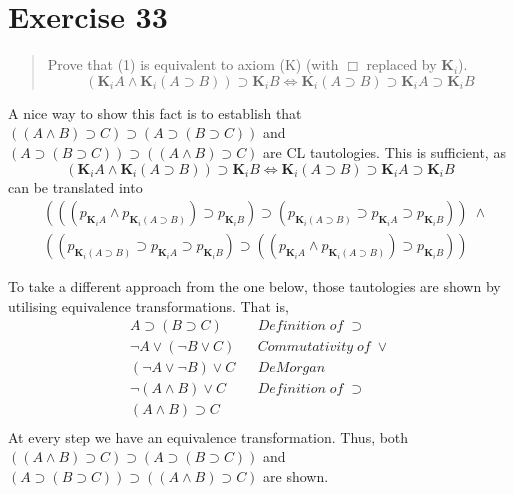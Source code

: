\documentclass[11pt,a4paper]{article}
\newcommand{\lto}{\supset}
\newcommand{\all}{\Box}
\newcommand{\eall}{\mathbf{K}}
\begin{document}
\section*{Exercise 33}
\begin{quote}
Prove that (1) is equivalent to axiom (K) (with $\all$ replaced by $\eall_i$).
\begin{equation*}
(\eall_i A \land \eall_i (A \lto B)) \lto \eall_i B \iff \eall_i(A \lto B) \lto \eall_i A \lto \eall_i B
\end{equation*}
\end{quote}

A nice way to show this fact is to establish that $((A \land B) \lto C) \lto (A \lto (B \lto C))$ and $(A \lto (B \lto C)) \lto ((A \land B) \lto C) $ are CL tautologies. This is sufficient, as 
\begin{equation*}
(\eall_i A \land \eall_i (A \lto B)) \lto \eall_i B \iff \eall_i(A \lto B) \lto \eall_i A \lto \eall_i B
\end{equation*}
can be translated into
\begin{equation*}
\begin{split}
&(((p_{\eall_i A} \land p_{\eall_i (A \lto B)}) \lto p_{\eall_i B}) \lto (p_{\eall_i(A \lto B)} \lto p_{\eall_i A} \lto p_{\eall_i B})) \; \land \\
&((p_{\eall_i(A \lto B)} \lto p_{\eall_i A} \lto p_{\eall_i B}) \lto ((p_{\eall_i A} \land p_{\eall_i (A \lto B)}) \lto p_{\eall_i B}))
\end{split}
\end{equation*}

To take a different approach from the one below, those tautologies are shown by utilising equivalence transformations. That is, 
\begin{align*}
& A \lto (B \lto C) &&  \mathit{Definition \; of \;} \lto&  \\
& \neg A \lor ( \neg B \lor C) && \mathit{Commutativity \; of \;} \lor& \\
& (\neg A \lor \neg B ) \lor C && \mathit{DeMorgan}& \\
& \neg( A \land B ) \lor C && \mathit{Definition \; of \;} \lto& \\
& ( A \land B ) \lto C && & \\
\end{align*}
At every step we have an equivalence transformation. Thus, both $((A \land B) \lto C) \lto (A \lto (B \lto C))$ and $(A \lto (B \lto C)) \lto ((A \land B) \lto C) $ are shown.\\
\end{document}

